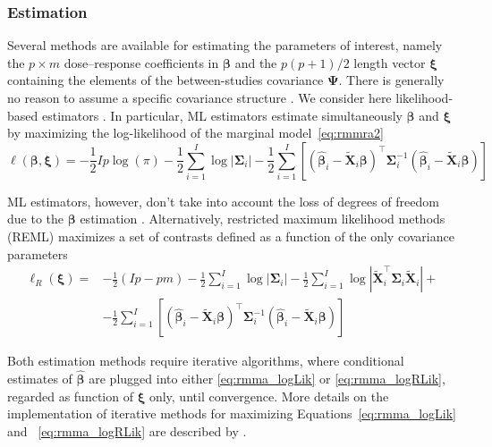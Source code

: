 \documentclass[11pt,a4paper,twoside,openany]{book}\usepackage{knitr}
\begin{document}
{{\subsubsection*{Estimation}

Several methods are available for estimating the parameters of interest, namely the $p \times m$ dose--response coefficients in $\boldsymbol{\beta}$ and the $p(p+1)/2$ length vector $\boldsymbol{\xi}$ containing the elements of the between-studies covariance $\boldsymbol{\Psi}$. There is generally no reason to assume a specific covariance structure \citep{white2011multivariate}. We consider here likelihood-based estimators \citep{verbeke1997linear, pinheiro2010mixed}. In particular, ML estimators estimate simultaneously $\boldsymbol{\beta}$ and $\boldsymbol{\xi}$ by maximizing the log-likelihood of the marginal model~\ref{eq:rmmra2}
\begin{equation}
\ell\left(\boldsymbol{\beta}, \boldsymbol{\xi} \right) = -\frac{1}{2}Ip\log(\pi) -\frac{1}{2}\sum_{i=1}^I \log |\boldsymbol{\Sigma}_i| - \frac{1}{2}\sum_{i=1}^I\left[ \left(\boldsymbol{\hat \beta}_i - \widetilde{\mathbf{X}}_i\boldsymbol{\beta} \right)^\top \boldsymbol{\Sigma}_i^{-1} \left(\boldsymbol{\hat \beta}_i - \widetilde{\mathbf{X}}_i\boldsymbol{\beta} \right) \right]
\label{eq:rmma_logLik}
\end{equation}

\noindent ML estimators, however, don’t take into account the loss of degrees of freedom due to the $\boldsymbol{\beta}$ estimation \citep{harville1977maximum}. Alternatively, restricted maximum likelihood methods (REML) maximizes a set of contrasts defined as a function of the only covariance parameters
\begin{equation}
\begin{split}
\ell_R\left(\boldsymbol{\xi} \right) =& -\frac{1}{2}\left(Ip - pm\right) -\frac{1}{2}\sum_{i=1}^I \log |\boldsymbol{\Sigma}_i| -\frac{1}{2}\sum_{i=1}^I \log \left|\widetilde{\mathbf{X}}_i^\top\boldsymbol{\Sigma}_i\widetilde{\mathbf{X}}_i \right| + \\
&- \frac{1}{2}\sum_{i=1}^I\left[ \left(\boldsymbol{\hat \beta}_i - \widetilde{\mathbf{X}}_i\boldsymbol{\beta} \right)^\top \boldsymbol{\Sigma}_i^{-1} \left(\boldsymbol{\hat \beta}_i - \widetilde{\mathbf{X}}_i\boldsymbol{\beta} \right) \right]
\end{split}
\label{eq:rmma_logRLik}
\end{equation}

\noindent Both estimation methods require iterative algorithms, where conditional estimates of $\boldsymbol{\hat \beta}$ are plugged into either \ref{eq:rmma_logLik} or \ref{eq:rmma_logRLik}, regarded as function of $\boldsymbol{\xi}$ only, until convergence. More details on the implementation of iterative methods for maximizing Equations~\ref{eq:rmma_logLik} and ~\ref{eq:rmma_logRLik} are described by \cite{gasparrini2012multivariate}.


}}
\end{document}
